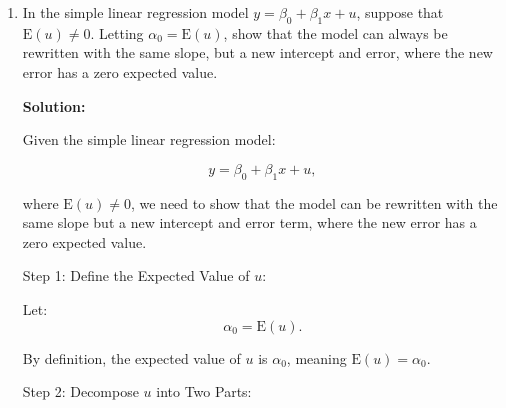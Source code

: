 \documentclass[12pt]{article}
\begin{document}
\begin{enumerate}
{\color{blue}
\noindent \textbf{Solution:}

\begin{enumerate}
    \item The intercept \( 1200 \) represents the predicted salary for a male (since "woman" equals 0 for males). Therefore, the intercept indicates that the average predicted salary for a male is \( 1200 \) Euros per month.

\item The slope coefficient \( -100 \) indicates that, on average, women earn \( 100 \) Euros less than men, holding everything else constant. If the value of "woman" is 1 (indicating female), the predicted salary decreases by \( 100 \) Euros.

\item To find the predicted salary for a woman, substitute \( \text{woman} = 1 \) into the regression equation:

$$
\widehat{\text{salary}} = 1200 - 100 \times 1 = 1200 - 100 = 1100 \text{ Euros}.
$$

Thus, the predicted salary for a woman is \( 1100 \) Euros per month.

    \end{enumerate}

}


\item In the simple linear regression model $y=\beta_0+\beta_1 x+u$, suppose that $\mathrm{E}(u) \neq 0$. Letting $\alpha_0=\mathrm{E}(u)$, show that the model can always be rewritten with the same slope, but a new intercept and error, where the new error has a zero expected value.

{\color{blue}
\noindent \textbf{Solution:}

Given the simple linear regression model:

\[
y = \beta_0 + \beta_1 x + u,
\]

where \( \mathrm{E}(u) \neq 0 \), we need to show that the model can be rewritten with the same slope but a new intercept and error term, where the new error has a zero expected value.

Step 1: Define the Expected Value of \( u \):

Let:
\[
\alpha_0 = \mathrm{E}(u).
\]

By definition, the expected value of \( u \) is \( \alpha_0 \), meaning \( \mathrm{E}(u) = \alpha_0 \).

Step 2: Decompose \( u \) into Two Parts:

}
\end{enumerate}
\end{document}
